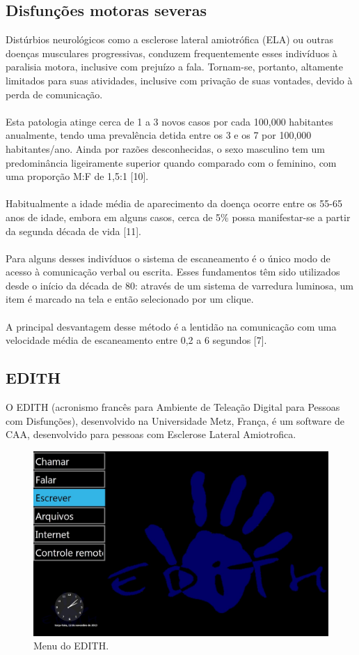 \documentclass[twoside]{article}
\begin{document}
\begin{multicols}{2}
\subsection{Disfunções motoras severas}
Distúrbios neurológicos como a esclerose lateral amiotrófica (ELA) ou outras doenças musculares progressivas, conduzem frequentemente esses indivíduos à paralisia motora, inclusive com prejuízo a fala. Tornam-se, portanto, altamente limitados para suas atividades, inclusive com privação de suas vontades, devido à perda de comunicação.
\\\\
Esta patologia atinge cerca de 1 a 3 novos casos por cada 100,000 habitantes anualmente, tendo uma prevalência detida entre os 3 e os 7 por 100,000 habitantes/ano. Ainda por razões desconhecidas, o sexo masculino tem um predominância ligeiramente superior quando comparado com o feminino, com uma proporção M:F de 1,5:1 [10]. 
\\\\
Habitualmente a idade média de aparecimento da doença ocorre entre os 55-65 anos de idade, embora em  alguns casos, cerca de 5\% possa manifestar-se a partir da segunda década de vida [11].
\\\\
Para alguns desses indivíduos o sistema de escaneamento é o único modo de acesso à comunicação verbal ou escrita. Esses fundamentos têm sido utilizados desde o início da década de 80: através de um sistema de varredura luminosa, um item é marcado na tela e então selecionado por um clique.
\\\\
A principal desvantagem desse método é a lentidão na comunicação com uma velocidade média de escaneamento entre 0,2 a 6 segundos [7].

\subsection{EDITH}
O EDITH (acronismo francês para Ambiente de Teleação Digital para Pessoas com Disfunções), desenvolvido na Universidade Metz, França, é um software de CAA, desenvolvido para pessoas com Esclerose Lateral Amiotrofica.

\begin{figure}[H]
\label{fig:edith_menu}
  \caption{Menu do EDITH.}
  \centering
    \includegraphics[scale = 0.19]{edith_menu.png}
\end{figure}


\end{multicols}
\end{document}
